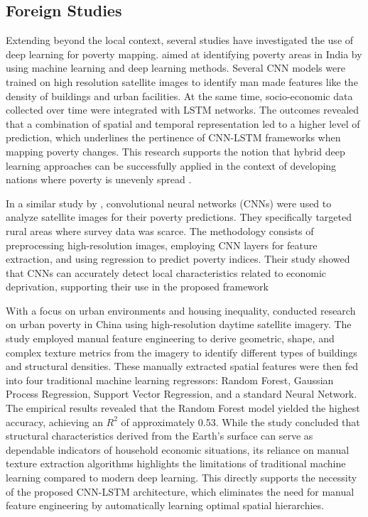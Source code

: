 \documentclass[12pt, letterpaper]{article}
\numberwithin{figure}{section}
\numberwithin{table}{section}
\begin{document}
\subsection{Foreign Studies}
Extending beyond the local context, several studies have investigated
the use of deep learning for poverty mapping.
\textcite{SrishtiGulecha2024} aimed at identifying poverty areas in
India by using machine learning and deep learning methods. Several
CNN models were trained on high resolution satellite images to
identify man made features like the density of buildings and urban
facilities. At the same time, socio-economic data collected over time
were integrated with LSTM networks. The outcomes revealed that a
combination of spatial and temporal representation led to a higher
level of prediction, which underlines the pertinence of CNN-LSTM
frameworks when mapping poverty changes. This research supports the
notion that hybrid deep learning approaches can be successfully
applied in the context of developing nations where poverty is
unevenly spread \parencite{SrishtiGulecha2024}.

In a similar study by \textcite{Saeed2023}, convolutional neural
networks (CNNs) were used to analyze satellite images for their
poverty predictions. They specifically targeted rural areas where
survey data was scarce. The methodology consists of preprocessing
high-resolution images, employing CNN layers for feature extraction,
and using regression to predict poverty indices. Their study showed
that CNNs can accurately detect local characteristics related to
economic deprivation, supporting their use in the proposed framework

With a focus on urban environments and housing inequality,
\textcite{Li2021} conducted research on urban poverty in China using
high-resolution daytime satellite imagery. The study employed manual
feature engineering to derive geometric, shape, and complex texture
metrics from the imagery to identify different types of buildings and
structural densities. These manually extracted spatial features were
then fed into four traditional machine learning regressors: Random
Forest, Gaussian Process Regression, Support Vector Regression, and a
standard Neural Network. The empirical results revealed that the
Random Forest model yielded the highest accuracy, achieving an $R^2$
of approximately 0.53. While the study concluded that structural
characteristics derived from the Earth's surface can serve as
dependable indicators of household economic situations, its reliance
on manual texture extraction algorithms highlights the limitations of
traditional machine learning compared to modern deep learning. This
directly supports the necessity of the proposed CNN-LSTM
architecture, which eliminates the need for manual feature
engineering by automatically learning optimal spatial hierarchies.
\end{document}
